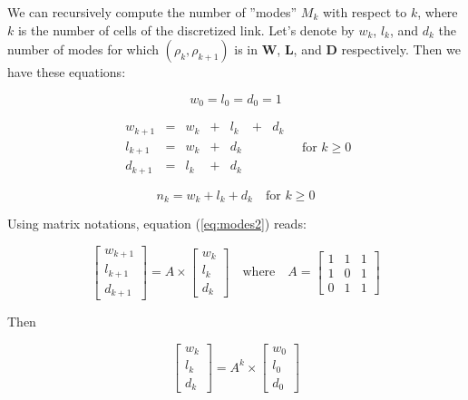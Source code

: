 \documentclass[11pt]{article}
\numberwithin{equation}{section}
\numberwithin{figure}{section}
\numberwithin{table}{section}
\begin{document}
We can recursively compute the number of ''modes'' $M_{k}$ with respect to $k$, where $k$ is the number of cells of the discretized link. Let's denote by $w_{k}$, $l_{k}$, and $d_{k}$ the number of modes for which $(\rho_{k},\rho_{k+1})$ is in \textbf{W}, \textbf{L}, and \textbf{D} respectively. Then we have these equations: 

\begin{equation}
w_{0} = l_{0} = d_{0} = 1
\label{eq:modes1}
\end{equation}

\begin{equation}
\begin{array}{lllllll}
w_{k+1} & = & w_{k} & + & l_{k} & + & d_{k}\\
l_{k+1} & = & w_{k} & + & d_{k} & & \\
d_{k+1} & = & l_{k} & + & d_{k} & &
\end{array} \quad \text{for }k \geq 0
\label{eq:modes2}
\end{equation}

\begin{equation}
n_{k} = w_{k} + l_{k} + d_{k} \quad \text{for }k \geq 0
\label{eq:modes3}
\end{equation}

Using matrix notations, equation (\ref{eq:modes2}) reads:

\begin{equation}
\left[ \begin{array}{c}
w_{k+1} \\
l_{k+1} \\
d_{k+1} \end{array} \right] = A \times 
\left[ \begin{array}{c}
w_{k} \\
l_{k} \\
d_{k} \end{array} \right]
\quad\text{where}\quad A = \left[ \begin{array}{ccc}
1 & 1 & 1 \\
1 & 0 & 1 \\
0 & 1 & 1 \end{array} \right]\label{eq:modes4}
\end{equation}

Then 

\begin{equation}
\left[ \begin{array}{c}
w_{k} \\
l_{k} \\
d_{k} \end{array} \right] = A^{k} \times 
\left[ \begin{array}{c}
w_{0} \\
l_{0} \\
d_{0} \end{array} \right]\label{eq:modes5}
\end{equation}
\end{document}

